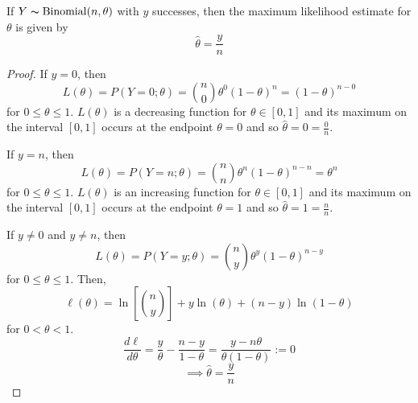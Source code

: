 \begin{thmbox}
    \begin{prop}
        If $ Y \thicksim \operatorname{Binomial}(n,\theta) $ with $ y $ successes, then the
        maximum likelihood estimate for $ \theta $ is given by
        \[ \hat{\theta}=\frac{y}{n} \]
    \end{prop}
\end{thmbox}
\begin{proof}
    If $ y=0 $, then
    \[ L(\theta)=P(Y=0;\theta)=\binom{n}{0}\theta^0(1-\theta)^n=(1-\theta)^{n-0} \]
    for $ 0\leqslant \theta \leqslant 1 $. $ L(\theta) $ is a decreasing function
    for $ \theta\in[0,1] $ and its maximum on the interval $ [0,1] $
    occurs at the endpoint $ \theta=0 $ and so $ \hat{\theta}=0=\frac{0}{n} $.

    If $ y=n $, then
    \[ L(\theta)=P(Y=n;\theta)=\binom{n}{n}\theta^n(1-\theta)^{n-n}=\theta^n \]
    for $ 0\leqslant \theta \leqslant 1 $. $ L(\theta) $ is an increasing function
    for $ \theta\in[0,1] $ and its maximum on the interval $ [0,1] $
    occurs at the endpoint $ \theta=1 $ and so $ \hat{\theta}=1=\frac{n}{n} $.

    If $ y\neq 0 $ and $ y\neq n $, then
    \[ L(\theta)=P(Y=y;\theta)=\binom{n}{y}\theta^y(1-\theta)^{n-y} \]
    for $ 0\leqslant \theta\leqslant 1 $. Then,
    \[ \ell(\theta)=\ln\left[ \binom{n}{y} \right]+y\ln(\theta)+(n-y)\ln(1-\theta) \]
    for $ 0<\theta<1 $.
    \[ \frac{d\ell}{d\theta}=\frac{y}{\theta}-\frac{n-y}{1-\theta}=\frac{y-n\theta}{\theta(1-\theta)}:=0  \]
    \[ \implies \hat{\theta}=\frac{y}{n} \]
\end{proof}

